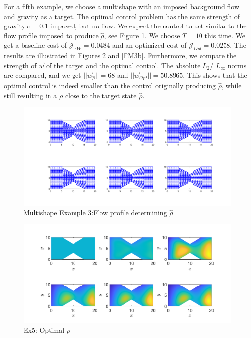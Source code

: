 \documentclass[final]{siamltex}
\newcommand{\w}{\vec{w}}
\newcommand{\hr}{\widehat \rho}
\begin{document}
For a fifth example, we choose a multishape with an imposed background flow and gravity as a target. The optimal control problem has the same strength of gravity $c = 0.1$ imposed, but no flow. We expect the control to act similar to the flow profile imposed to produce $\hr$, see Figure \ref{FM3}. We choose $T = 10$ this time.
We get a baseline cost of $\mathcal J_{FW} = 0.0484$ and an optimized cost of $\mathcal J_{Opt} = 0.0258$. The results are illustrated in Figures \ref{FM3a} and \ref{FM3b}. Furthermore, we compare the strength of $\w$ of the target and the optimal control. The absolute $L_2$/ $L_\infty$ norms are compared, and we get $||\w_{\hr}|| = 68$ and $||\w_{Opt}|| = 50.8965$. This shows that the optimal control is indeed smaller than the control originally producing $\hr$, while still resulting in a $\rho$ close to the target state $\hr$.
\begin{figure}[h]
	\centering
	\includegraphics[scale=0.25]{MultiwFW.png}
	\caption{Multishape Example 3:Flow profile determining $\hr$} 
	\label{FM3}
\end{figure}
\begin{figure}[h]
	\centering
	\includegraphics[scale=0.25]{MultiOpt3.png}
	\caption{Ex5: Optimal $\rho$} 
	\label{FM3a}
\end{figure}
\end{document}
